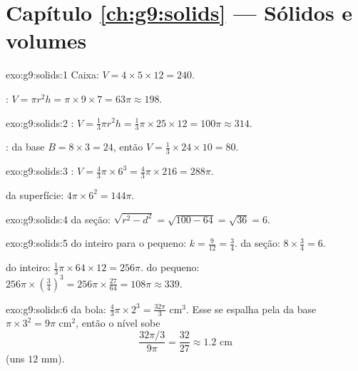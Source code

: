 \section*{Capítulo \ref{ch:g9:solids} --- Sólidos e volumes}

\begin{solution}{exo:g9:solids:1}
Caixa: $V = 4 \times 5 \times 12 = 240$.

: $V = \pi r^2 h = \pi \times 9 \times 7 = 63\pi \approx 198$.
\end{solution}

\begin{solution}{exo:g9:solids:2}
: $V = \frac13 \pi r^2 h = \frac13 \pi \times 25 \times 12 =
100\pi \approx 314$.

:  da base $B = 8 \times 3 = 24$, então
$V = \frac13 \times 24 \times 10 = 80$.
\end{solution}

\begin{solution}{exo:g9:solids:3}
: $V = \frac43 \pi \times 6^3 = \frac43 \pi \times 216 = 288\pi$.

 da superfície: $4\pi \times 6^2 = 144\pi$.
\end{solution}

\begin{solution}{exo:g9:solids:4}
 da seção: $\sqrt{r^2 - d^2} = \sqrt{100 - 64} = \sqrt{36} = 6$.
\end{solution}

\begin{solution}{exo:g9:solids:5}
 do  inteiro para o pequeno:
$k = \frac{9}{12} = \frac34$.  da seção:
$8 \times \frac34 = 6$.

 do  inteiro: $\frac13\pi \times 64 \times 12 = 256\pi$.
 do  pequeno: $256\pi \times \left(\frac34\right)^3 =
256\pi \times \frac{27}{64} = 108\pi \approx 339$.
\end{solution}

\begin{solution}{exo:g9:solids:6}
 da bola: $\frac43\pi \times 2^3 = \frac{32\pi}{3}$ cm$^3$. Esse
 se espalha pela  da base $\pi \times 3^2 = 9\pi$ cm$^2$,
então o nível sobe
\[
\frac{32\pi/3}{9\pi} = \frac{32}{27} \approx 1.2 \text{ cm}
\]
(uns $12$ mm).
\end{solution}

